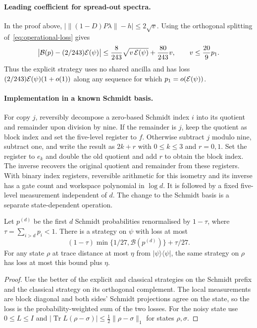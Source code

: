 \paragraph{Leading coefficient for spread-out spectra.}
In the proof above, $|\|(1-D)P\lambda\|-h|\le2\sqrt v$. Using the orthogonal splitting of~\eqref{eq:operational-loss} gives
\[
 \bigl|\mathcal B(p)-(2/243)\mathcal{E}(\psi)\bigr|
 \le \frac8{243}\sqrt{v\,\mathcal{E}(\psi)}+\frac{80}{243}v,
 \qquad v\le\frac{20}{9}p_1.
\]
Thus the explicit strategy uses no shared ancilla and has loss $(2/243)\mathcal{E}(\psi)(1+o(1))$ along any sequence for which $p_1=o(\mathcal{E}(\psi))$.

\paragraph{Implementation in a known Schmidt basis.}
For copy $j$, reversibly decompose a zero-based Schmidt index $i$ into its quotient and remainder upon division by nine. If the remainder is $j$, keep the quotient as block index and set the five-level register to $f$. Otherwise subtract $j$ modulo nine, subtract one, and write the result as $2k+r$ with $0\le k\le3$ and $r=0,1$. Set the register to $e_k$ and double the old quotient and add $r$ to obtain the block index. The inverse recovers the original quotient and remainder from these registers. With binary index registers, reversible arithmetic for this isometry and its inverse has a gate count and workspace polynomial in $\log d$. It is followed by a fixed five-level measurement independent of $d$. The change to the Schmidt basis is a separate state-dependent operation.

\begin{corollary}\label{cor:operational-truncation}
Let $p^{(d)}$ be the first $d$ Schmidt probabilities renormalised by $1-\tau$, where $\tau=\sum_{i>d}p_i<1$. There is a strategy on $\psi$ with loss at most
\[
 (1-\tau)\min\{1/27,\mathcal B(p^{(d)})\}+\tau/27.
\]
For any state $\rho$ at trace distance at most $\eta$ from $|\psi\rangle\langle\psi|$, the same strategy on $\rho$ has loss at most this bound plus $\eta$.
\end{corollary}

\begin{proof}
Use the better of the explicit and classical strategies on the Schmidt prefix and the classical strategy on its orthogonal complement. The local measurements are block diagonal and both sides' Schmidt projections agree on the state, so the loss is the probability-weighted sum of the two losses. For the noisy state use $0\le L\le I$ and $|\operatorname{Tr}L(\rho-\sigma)|\le\tfrac12\|\rho-\sigma\|_1$ for states $\rho,\sigma$.
\end{proof}

